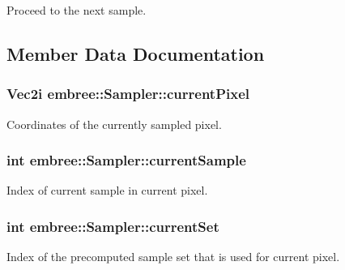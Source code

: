 Proceed to the next sample. 



\subsection{Member Data Documentation}
\hypertarget{classembree_1_1_sampler_a74b47fa80bd0380e31c4c54d8a2467ce}{
\subsubsection[{currentPixel}]{\setlength{\rightskip}{0pt plus 5cm}Vec2i {\bf embree::Sampler::currentPixel}}}
\label{classembree_1_1_sampler_a74b47fa80bd0380e31c4c54d8a2467ce}


Coordinates of the currently sampled pixel. 

\hypertarget{classembree_1_1_sampler_ae2b3b42c1fdb1edc47f1768f5da477d0}{
\subsubsection[{currentSample}]{\setlength{\rightskip}{0pt plus 5cm}int {\bf embree::Sampler::currentSample}}}
\label{classembree_1_1_sampler_ae2b3b42c1fdb1edc47f1768f5da477d0}


Index of current sample in current pixel. 

\hypertarget{classembree_1_1_sampler_a0654a2f76c561619a3741ac89a59ee96}{
\subsubsection[{currentSet}]{\setlength{\rightskip}{0pt plus 5cm}int {\bf embree::Sampler::currentSet}}}
\label{classembree_1_1_sampler_a0654a2f76c561619a3741ac89a59ee96}


Index of the precomputed sample set that is used for current pixel. 

